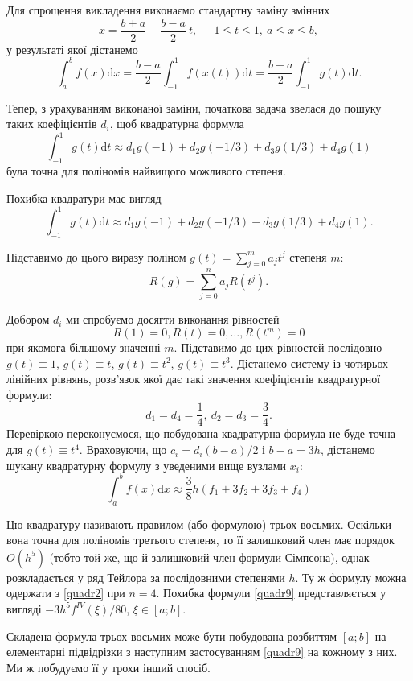 \documentclass[14pt,twoside]{extreport}
\theoremstyle{mystyle}
\numberwithin{equation}{chapter}
\begin{document}
Для спрощення викладення виконаємо стандартну заміну змінних
\[
 x=\frac{b+a}{2}+\frac{b-a}{2}\ t,\ -1\leqslant t\leqslant 1,\ a\leqslant x\leqslant b,
\]
у результаті якої дістанемо
\[
 \int_{a}^{b}f(x)\mathrm{d}x = \frac{b-a}{2}\int_{-1}^{1}f(x(t))\mathrm{d}t = \frac{b-a}{2}\int_{-1}^{1}g(t)\mathrm{d}t.
\]

Тепер, з урахуванням виконаної заміни, початкова задача звелася до пошуку таких коефіцієнтів $d_i$, щоб квадратурна формула
\[
 \int_{-1}^{1}g(t)\mathrm{d}t\approx d_{1}g(-1)+d_{2}g(-1/3)+d_{3}g(1/3)+d_{4}g(1)
\]
була точна для поліномів найвищого можливого степеня.

Похибка квадратури має вигляд
\[
 \int_{-1}^{1}g(t)\mathrm{d}t \approx d_{1}g(-1)+d_{2}g(-1/3)+d_{3}g(1/3)+d_{4}g(1).
\]

Підставимо до цього виразу поліном $g(t)=\displaystyle \sum_{j=0}^{m}a_{j}t^{j}$ степеня $m$:
\[
 R(g)=\sum_{j=0}^{n}a_{j}R(t^{j}).
\]

Добором $d_i$ ми спробуємо досягти виконання рівностей
\[
 R(1)=0, R(t)=0, \ldots, R(t^{m})=0
\]
при якомога більшому значенні $m$. Підставимо до цих рівностей послідовно $g(t) \equiv 1$, $g(t) \equiv t$, $g(t) \equiv t^2$, $g(t) \equiv t^3$. Дістанемо систему із чотирьох лінійних рівнянь, розв'язок якої дає такі значення коефіцієнтів квадратурної формули:
\[
 d_{1}=d_{4}=\frac{1}{4},\ d_{2}=d_{3}=\frac{3}{4}.
\]
Перевіркою переконуємося, що побудована квадратурна формула не буде точна для $g(t) \equiv t^4$. Враховуючи, що $c_i = d_i(b - a)/2$ і $b - a = 3h$, дістанемо шукану квадратурну формулу з уведеними вище вузлами $x_i$:
\begin{equation}\label{quadr9}
 \displaystyle \int_{a}^{b}f(x)\mathrm{d}x \approx \frac{3}{8} h(f_{1}+3f_{2}+3f_{3}+f_{4})
\end{equation}

Цю квадратуру називають правилом (або формулою) трьох восьмих. Оскільки вона точна для поліномів третього степеня, то її залишковий член має порядок $O(h^5)$ (тобто той же, що й залишковий член формули Сімпсона), однак розкладається у ряд Тейлора за послідовними степенями $h$. Ту ж формулу можна одержати з \eqref{quadr2} при $n = 4$. Похибка формули \eqref{quadr9} представляється у вигляді $-3h^5 f^{IV}(\xi)/80$, $\xi \in [a; b]$.

Складена формула трьох восьмих може бути побудована розбиттям $[a; b]$ на елементарні підвідрізки з наступним застосуванням \eqref{quadr9} на кожному з них. Ми ж побудуємо її у трохи інший спосіб.
\end{document}
